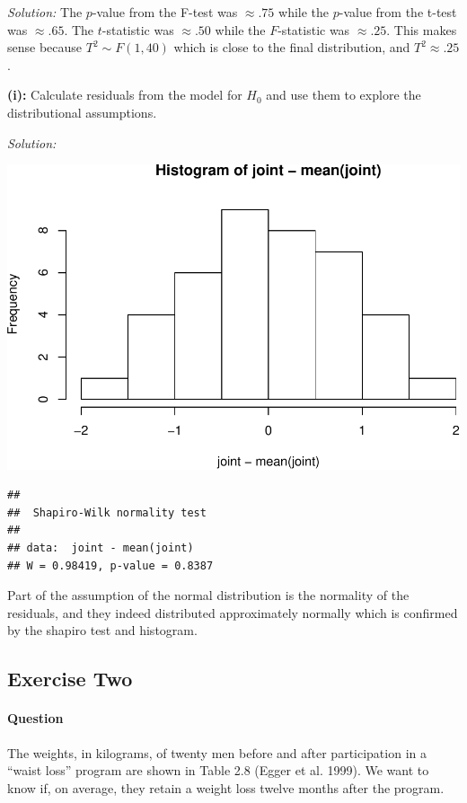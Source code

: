 \documentclass[]{article}
\let\oldparagraph\paragraph
\renewcommand{\paragraph}[1]{\oldparagraph{#1}\mbox{}}
\begin{document}
\emph{Solution: }The \(p\)-value from the F-test was \(\approx .75\)
while the \(p\)-value from the t-test was \(\approx .65\). The
\(t\)-statistic was \(\approx .50\) while the \(F\)-statistic was
\(\approx .25\). This makes sense because \(T^2 \sim F(1,40)\) which is
close to the final distribution, and \(T^2 \approx .25\).

\textbf{(i):} Calculate residuals from the model for \(H_0\) and use
them to explore the distributional assumptions.

\emph{Solution: }

\includegraphics{ExercisesWithSolutions_files/figure-latex/unnamed-chunk-6-1.pdf}

\begin{verbatim}
## 
##  Shapiro-Wilk normality test
## 
## data:  joint - mean(joint)
## W = 0.98419, p-value = 0.8387
\end{verbatim}

Part of the assumption of the normal distribution is the normality of
the residuals, and they indeed distributed approximately normally which
is confirmed by the shapiro test and histogram.

\subsection{Exercise Two}\label{exercise-two}

\paragraph{Question}\label{question-1}

The weights, in kilograms, of twenty men before and after participation
in a ``waist loss'' program are shown in Table 2.8 (Egger et al. 1999).
We want to know if, on average, they retain a weight loss twelve months
after the program.
\end{document}
